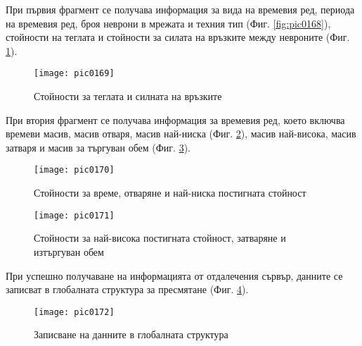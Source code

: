 При първия фрагмент се получава информация за вида на времевия ред, периода на времевия ред, броя неврони в мрежата и техния тип (Фиг. \ref{fig:pic0168}), стойности на теглата и стойности за силата на връзките между невроните (Фиг. \ref{fig:pic0169}).

\begin{figure}[h]
  \centering
  \texttt{[image: pic0169]}
  \caption{Стойности за теглата и силната на връзките}
\label{fig:pic0169}
\end{figure}
\FloatBarrier

При втория фрагмент се получава информация за времевия ред, което включва времеви масив, масив отваря, масив най-ниска (Фиг. \ref{fig:pic0170}), масив най-висока, масив затваря и масив за търгуван обем (Фиг. \ref{fig:pic0171}).

\begin{figure}[h]
  \centering
  \texttt{[image: pic0170]}
  \caption{Стойности за време, отваряне и най-ниска постигната стойност}
\label{fig:pic0170}
\end{figure}
\FloatBarrier

\begin{figure}[h]
  \centering
  \texttt{[image: pic0171]}
  \caption{Стойности за най-висока постигната стойност, затваряне и изтъргуван обем}
\label{fig:pic0171}
\end{figure}
\FloatBarrier

При успешно получаване на информацията от отдалечения сървър, данните се записват в глобалната структура за пресмятане (Фиг. \ref{fig:pic0172}).

\begin{figure}[h]
  \centering
  \texttt{[image: pic0172]}
  \caption{Записване на данните в глобалната структура}
\label{fig:pic0172}
\end{figure}
\FloatBarrier
